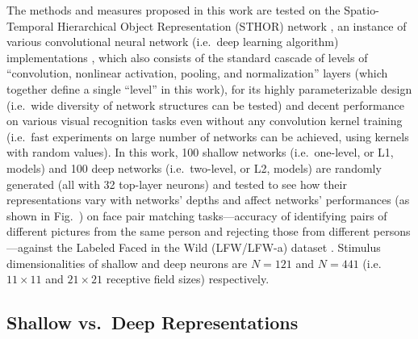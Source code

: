 
The methods and measures proposed in this work are tested on the Spatio-Temporal Hierarchical Object Representation (STHOR) network \cite{pinto2009high, sthor}, an instance of various convolutional neural network (i.e.~deep learning algorithm) implementations \cite{fukushima1980neocognitron, lecun1998gradient, riesenhuber1999hierarchical, krizhevsky2012imagenet}, which also consists of the standard cascade of levels of ``convolution, nonlinear activation, pooling, and normalization'' layers (which together define a single ``level'' in this work), for its highly parameterizable design (i.e.~wide diversity of network structures can be tested) and decent performance on various visual recognition tasks \cite{pinto2009high, cox2011beyond, viglarge} even without any convolution kernel training (i.e.~fast experiments on large number of networks can be achieved, using kernels with random values). In this work, 100 shallow networks (i.e.~one-level, or L1, models) and 100 deep networks (i.e.~two-level, or L2, models) are randomly generated (all with 32 top-layer neurons) and tested to see how their representations vary with networks' depths and affect networks' performances (as shown in Fig.~\SFpef{}) on face pair matching tasks---accuracy of identifying pairs of different pictures from the same person and rejecting those from different persons---against the Labeled Faced in the Wild (LFW/LFW-a) dataset \cite{LFWTech, wolf2011effective}. Stimulus dimensionalities of shallow and deep neurons are $N=121$ and $N=441$ (i.e.~$11\times11$ and $21\times21$ receptive field sizes) respectively.

\subsection*{Shallow vs.~Deep Representations}

